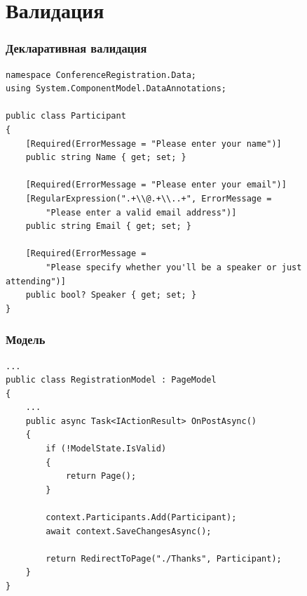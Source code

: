 \documentclass{../../slides-style}
\begin{document}
    \section{Валидация}

    \begin{frame}[fragile]
        \frametitle{Декларативная валидация}
        \begin{footnotesize}
            \begin{verbatim}
namespace ConferenceRegistration.Data;
using System.ComponentModel.DataAnnotations;

public class Participant
{
    [Required(ErrorMessage = "Please enter your name")]
    public string Name { get; set; }

    [Required(ErrorMessage = "Please enter your email")]
    [RegularExpression(".+\\@.+\\..+", ErrorMessage = 
        "Please enter a valid email address")]
    public string Email { get; set; }

    [Required(ErrorMessage = 
        "Please specify whether you'll be a speaker or just attending")]
    public bool? Speaker { get; set; }
}
            \end{verbatim}
        \end{footnotesize}
    \end{frame}

    \begin{frame}[fragile]
        \frametitle{Модель}
        \begin{footnotesize}
            \begin{verbatim}
...
public class RegistrationModel : PageModel
{
    ...
    public async Task<IActionResult> OnPostAsync()
    {
        if (!ModelState.IsValid)
        {
            return Page();
        }

        context.Participants.Add(Participant);
        await context.SaveChangesAsync();

        return RedirectToPage("./Thanks", Participant);
    }
}
            \end{verbatim}
        \end{footnotesize}
    \end{frame}
\end{document}
